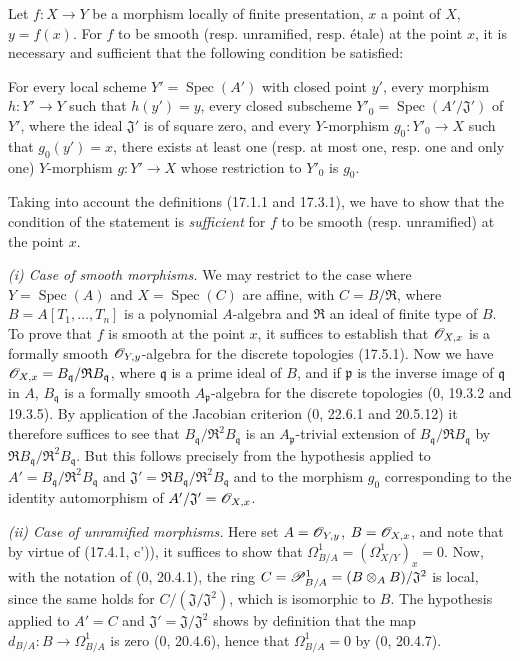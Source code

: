 \begin{proposition}[17.14.1]
\label{IV.17.14.1}
Let $f:X\to Y$ be a morphism locally of finite presentation, $x$ a point of $X$, $y=f(x)$. For $f$ to be smooth (resp. unramified, resp. étale) at the point $x$, it is necessary and sufficient that the following condition be satisfied:

For every local scheme $Y'=\operatorname{Spec}(A')$ with closed point $y'$, every morphism $h:Y'\to Y$ such that $h(y')=y$, every closed subscheme $Y'_0=\operatorname{Spec}(A'/\mathfrak{J}')$ of $Y'$, where the ideal $\mathfrak{J}'$ is of square zero, and every $Y$-morphism $g_0:Y'_0\to X$ such that $g_0(y')=x$, there exists at least one (resp. at most one, resp. one and only one) $Y$-morphism $g:Y'\to X$ whose restriction to $Y'_0$ is $g_0$.
\end{proposition}

Taking into account the definitions (17.1.1 and 17.3.1), we have to show that the condition of the statement is \emph{sufficient} for $f$ to be smooth (resp. unramified) at the point $x$.

\emph{(i) Case of smooth morphisms.} We may restrict to the case where $Y=\operatorname{Spec}(A)$ and $X=\operatorname{Spec}(C)$ are affine, with $C=B/\mathfrak{R}$, where $B=A[T_1,\ldots,T_n]$ is a polynomial $A$-algebra and $\mathfrak{R}$ an ideal of finite type of $B$. To prove that $f$ is smooth at the point $x$, it suffices to establish that $\mathscr{O}_{X,x}$ is a formally smooth $\mathscr{O}_{Y,y}$-algebra for the discrete topologies (17.5.1). Now we have $\mathscr{O}_{X,x}=B_{\mathfrak q}/\mathfrak{R}B_{\mathfrak q}$, where $\mathfrak q$ is a prime ideal of $B$, and if $\mathfrak p$ is the inverse image of $\mathfrak q$ in $A$, $B_{\mathfrak q}$ is a formally smooth $A_{\mathfrak p}$-algebra for the discrete topologies (0, 19.3.2 and 19.3.5). By application of the Jacobian criterion (0, 22.6.1 and 20.5.12) it therefore suffices to see that $B_{\mathfrak q}/\mathfrak{R}^2B_{\mathfrak q}$ is an $A_{\mathfrak p}$-trivial extension of $B_{\mathfrak q}/\mathfrak{R}B_{\mathfrak q}$ by $\mathfrak{R}B_{\mathfrak q}/\mathfrak{R}^2B_{\mathfrak q}$. But this follows precisely from the hypothesis applied to $A'=B_{\mathfrak q}/\mathfrak{R}^2B_{\mathfrak q}$ and $\mathfrak{J}'=\mathfrak{R}B_{\mathfrak q}/\mathfrak{R}^2B_{\mathfrak q}$ and to the morphism $g_0$ corresponding to the identity automorphism of $A'/\mathfrak{J}'=\mathscr{O}_{X,x}$.

\emph{(ii) Case of unramified morphisms.} Here set $A=\mathscr{O}_{Y,y}$, $B=\mathscr{O}_{X,x}$, and note that by virtue of (17.4.1, c')), it suffices to show that $\Omega^1_{B/A}=(\Omega^1_{X/Y})_x=0$. Now, with the notation of (0, 20.4.1), the ring $C=\mathscr{P}^1_{B/A}=(B\otimes_A B)/\mathfrak{J}^2$ is local, since the same holds for $C/(\mathfrak{J}/\mathfrak{J}^2)$, which is isomorphic to $B$. The hypothesis applied to $A'=C$ and $\mathfrak{J}'=\mathfrak{J}/\mathfrak{J}^2$ shows by definition that the map $d_{B/A}:B\to\Omega^1_{B/A}$ is zero (0, 20.4.6), hence that $\Omega^1_{B/A}=0$ by (0, 20.4.7).


